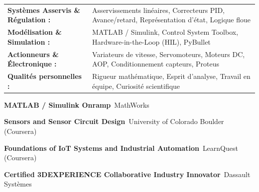 \documentclass[10pt,a4paper]{../altacv}
\begin{document}
{\small
\begin{tabular}{@{}ll@{}}
\textbf{Systèmes Asservis \& Régulation :} & Asservissements linéaires, Correcteurs PID, Avance/retard, Représentation d'état, Logique floue \\[1.5pt]
\textbf{Modélisation \& Simulation :} & MATLAB / Simulink, Control System Toolbox, Hardware-in-the-Loop (HIL), PyBullet \\[1.5pt]
\textbf{Actionneurs \& Électronique :} & Variateurs de vitesse, Servomoteurs, Moteurs DC, AOP, Conditionnement capteurs, Proteus \\[1.5pt]
\textbf{Qualités personnelles :} & Rigueur mathématique, Esprit d'analyse, Travail en équipe, Curiosité scientifique
\end{tabular}
}

\begin{cvitems}
  \item \textbf{MATLAB / Simulink Onramp}~\hfill {\color{emphasis}MathWorks}
  \item \textbf{Sensors and Sensor Circuit Design}~\hfill {\color{emphasis}University of Colorado Boulder (Coursera)}
  \item \textbf{Foundations of IoT Systems and Industrial Automation}~\hfill {\color{emphasis}LearnQuest (Coursera)}
  \item \textbf{Certified 3DEXPERIENCE Collaborative Industry Innovator}~\hfill {\color{emphasis}Dassault Systèmes}
\end{cvitems}

\cvactivites
\cvlangues
\end{document}
